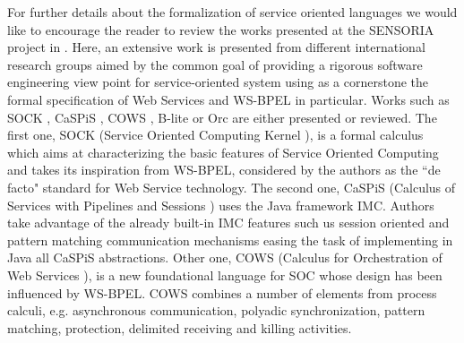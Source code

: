 For further details about the formalization of service oriented languages we would like to encourage the reader to review the works presented at the SENSORIA project in \cite{Wirsing2011bis}. Here, an extensive work is presented from different international research groups aimed by the common goal of providing a rigorous software engineering view point for service-oriented system using as a cornerstone the formal specification of Web Services and WS-BPEL in particular. Works such as SOCK \cite{Wirsing2011bis}, CaSPiS \cite{Bettini2008}, COWS \cite{Lapadula2007}, B-lite \cite{Lapadula2008} or Orc \cite{Kitchin2009} are either presented or reviewed. The first one, SOCK (Service Oriented Computing Kernel \cite{Wirsing2011bis}), is a formal calculus which aims at characterizing the basic features of Service Oriented Computing and takes its inspiration from WS-BPEL, considered by the authors as the ``de facto" standard for Web Service technology. The second one, CaSPiS (Calculus of Services with Pipelines and Sessions \cite{Bettini2008}) uses the Java framework IMC. Authors take advantage of the already built-in IMC features such us session oriented and pattern matching communication mechanisms easing the task of implementing in Java all CaSPiS abstractions. Other one, COWS (Calculus for Orchestration of Web Services \cite{Lapadula2007}), is a new foundational language for SOC whose design has been influenced by WS-BPEL. COWS combines a number of elements from process calculi, e.g. asynchronous communication, polyadic synchronization, pattern matching, protection, delimited receiving and killing activities. 

